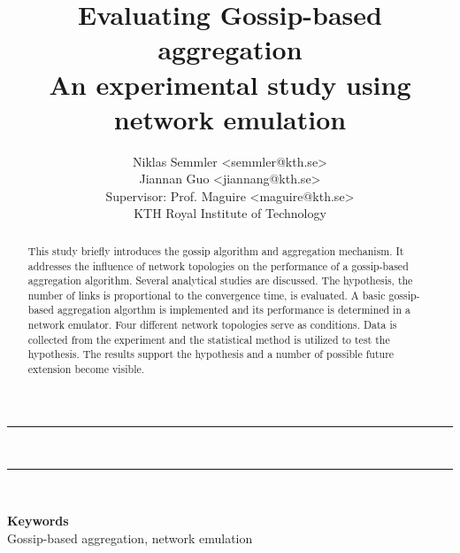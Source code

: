\documentclass[11pt,a4paper]{scrartcl}
\date{}
\title{Evaluating Gossip-based aggregation\\{\LARGE An experimental study using network emulation}}
\author{Niklas Semmler <semmler@kth.se>\\
Jiannan Guo <jiannang@kth.se>\\[0,25cm]
Supervisor: Prof. Maguire <maguire@kth.se>\\
KTH Royal Institute of Technology}%
\def\keywords#1{\begin{center}{\bf Keywords}\\{#1}\end{center}} %
\begin{document}
%
\maketitle
\newcommand{\HRule}{\rule{\linewidth}{0.5mm}}
\noindent\HRule \\
\begin{abstract}
\noindent This study briefly introduces the gossip algorithm and aggregation mechanism. It addresses the influence of network topologies on the performance of a gossip-based aggregation algorithm. Several analytical studies are discussed. The hypothesis, the number of links is proportional to the convergence time, is evaluated. A basic gossip-based aggregation algorthm is implemented and its performance is determined in a network emulator. Four different network topologies serve as conditions. Data is collected from the experiment and the statistical method is utilized to test the hypothesis. The results support the hypothesis and a number of possible future extension become visible.
\end{abstract}
\HRule \\
\keywords{Gossip-based aggregation, network emulation}%













\appendix
\end{document}
